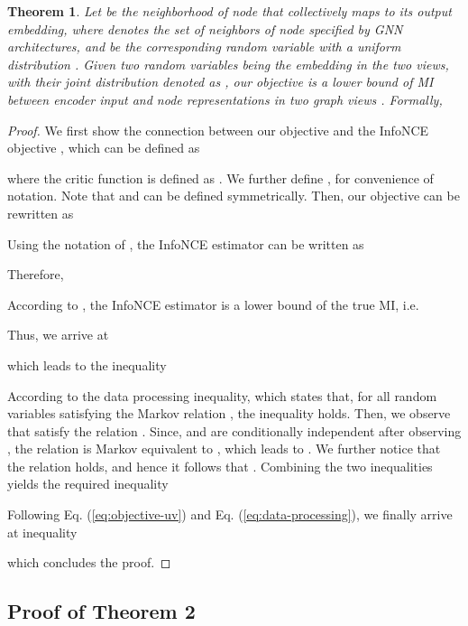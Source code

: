\documentclass{article}
\newtheorem{theorem}{Theorem}[section]
\theoremstyle{remark}
\begin{document}
\begin{theorem}
\label{thm:objective-InfoMax}
Let  be the neighborhood of node  that collectively maps to its output embedding, where  denotes the set of neighbors of node  specified by GNN architectures, and  be the corresponding random variable with a uniform distribution . Given two random variables  being the embedding in the two views, with their joint distribution denoted as , our objective  is a lower bound of MI between encoder input  and node representations in two graph views . Formally,

\end{theorem}

\begin{proof}
We first show the connection between our objective  and the InfoNCE objective \cite{vandenOord:2018ut} , which can be defined as \cite{Poole:2019vk}

where the critic function is defined as .
We further define ,  for convenience of notation.
Note that  and  can be defined symmetrically.
Then, our objective  can be rewritten as

Using the notation of , the InfoNCE estimator  can be written as

Therefore,

According to \cite{Poole:2019vk}, the InfoNCE estimator is a lower bound of the true MI, i.e.

Thus, we arrive at

which leads to the inequality


According to the data processing inequality, which states that, for all random variables  satisfying the Markov relation , the inequality  holds.
Then, we observe that  satisfy the relation . Since,  and  are conditionally independent after observing , the relation is Markov equivalent to , which leads to .
We further notice that the relation  holds, and hence it follows that .
Combining the two inequalities yields the required inequality

Following Eq. (\ref{eq:objective-uv}) and Eq. (\ref{eq:data-processing}), we finally arrive at inequality

which concludes the proof.
\end{proof}







\subsection{Proof of Theorem 2}
\end{document}
